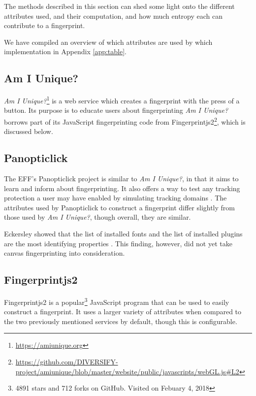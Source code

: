 \documentclass[
    fontsize=12pt,
    headings=small,
    parskip=half,
    bibliography=totoc,
    numbers=noenddot,
    open=any
]{scrreprt}
\begin{document}
The methods described in this section can shed some light onto the different attributes used, and their computation,
and how much entropy each can contribute to a fingerprint.

We have compiled an overview of which attributes are used by which implementation in Appendix \ref{app:table}.


\subsection{Am I Unique?}
\textit{Am I Unique?}\footnote{\url{https://amiunique.org}} \cite{laperdrix2016beauty} is a web service which creates
a fingerprint with the press of a button. Its purpose is to educate users about fingerprinting
\textit{Am I Unique?} borrows part of its JavaScript fingerprinting code from
Fingerprintjs2\footnote{\url{https://github.com/DIVERSIFY-project/amiunique/blob/master/website/public/javascripts/webGL.js\#L2}},
which is discussed below.


\subsection{Panopticlick}
The EFF's Panopticlick project is similar to \textit{Am I Unique?}, in that it aims to learn and inform about
fingerprinting. It also offers a way to test any tracking protection a user may have enabled by simulating
tracking domains \cite{panopticlick}. The attributes used by Panopticlick to construct a fingerprint differ slightly from those used by
\textit{Am I Unique?}, though overall, they are similar.

Eckersley showed that the list of installed fonts and the list of installed plugins are the most identifying properties
\cite{eckersley2010unique}. This finding, however, did not yet take canvas fingerprinting into consideration.


\subsection{Fingerprintjs2}
Fingerprintjs2 \cite{fingerprintjs2} is a popular\footnote{4891 stars and 712 forks on GitHub. Visited on Febuary 4, 2018}
JavaScript program that can be used to easily construct a fingerprint.
It uses a larger variety of attributes when compared to the two previously mentioned services by default, though this is configurable.
\end{document}
